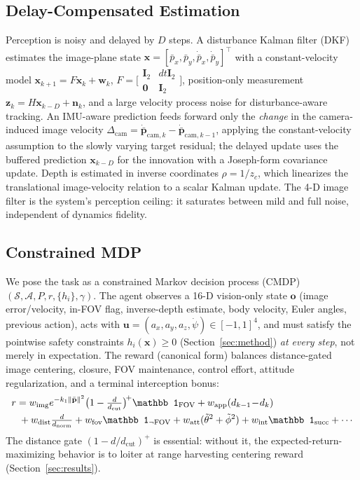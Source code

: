 \documentclass[journal]{IEEEtran}
\begin{document}
\subsection{Delay-Compensated Estimation}
Perception is noisy and delayed by $D$ steps. A disturbance Kalman filter
(DKF) estimates the image-plane state
$\mathbf x=[\bar p_x,\bar p_y,\dot{\bar p}_x,\dot{\bar p}_y]^\top$ with a
constant-velocity model $\mathbf x_{k+1}=F\mathbf x_k+\mathbf w_k$,
$F=\big[\begin{smallmatrix}\mathbf I_2&dt\mathbf I_2\\\mathbf 0&\mathbf I_2\end{smallmatrix}\big]$,
position-only measurement $\mathbf z_k=H\mathbf x_{k-D}+\mathbf n_k$, and a
large velocity process noise for disturbance-aware tracking. An IMU-aware
prediction feeds forward only the \emph{change} in the camera-induced image
velocity $\Delta_{\mathrm{cam}}=\dot{\bar{\mathbf p}}_{\mathrm{cam},k}-
\dot{\bar{\mathbf p}}_{\mathrm{cam},k-1}$, applying the constant-velocity
assumption to the slowly varying target residual; the delayed update uses the
buffered prediction $\mathbf x_{k-D}$ for the innovation with a Joseph-form
covariance update. Depth is estimated in inverse coordinates $\rho=1/z_c$,
which linearizes the translational image-velocity relation to a scalar Kalman
update. The 4-D image filter is the system's perception ceiling: it saturates
between mild and full noise, independent of dynamics fidelity.

\subsection{Constrained MDP}
We pose the task as a constrained Markov decision process (CMDP)
\cite{altman1999cmdp} $(\mathcal S,\mathcal A,P,r,\{h_i\},\gamma)$. The agent
observes a 16-D vision-only state $\mathbf o$ (image error/velocity, in-FOV
flag, inverse-depth estimate, body velocity, Euler angles, previous action),
acts with $\mathbf u=(a_x,a_y,a_z,\dot\psi)\in[-1,1]^4$, and must satisfy the
pointwise safety constraints $h_i(\mathbf x)\ge0$ (Section~\ref{sec:method})
\emph{at every step}, not merely in expectation. The reward (canonical form)
balances distance-gated image centering, closure, FOV maintenance, control
effort, attitude regularization, and a terminal interception bonus:
\begin{align}
r &= w_{\mathrm{img}}e^{-k_1\lVert\bar{\mathbf p}\rVert^2}
      \big(1-\tfrac{d}{d_{\mathrm{cut}}}\big)^{\!+}\mathbb 1_{\mathrm{FOV}}
   + w_{\mathrm{app}}(d_{k-1}\!-\!d_k) \notag\\
  &\;+ w_{\mathrm{dist}}\tfrac{d}{d_{\mathrm{norm}}}
   + w_{\mathrm{fov}}\mathbb 1_{\neg\mathrm{FOV}}
   + w_{\mathrm{att}}(\tilde\theta^2+\tilde\phi^2)
   + w_{\mathrm{int}}\mathbb 1_{\mathrm{succ}} + \cdots
\label{eq:reward}
\end{align}
The distance gate $(1-d/d_{\mathrm{cut}})^+$ is essential: without it, the
expected-return-maximizing behavior is to loiter at range harvesting centering
reward (Section~\ref{sec:results}).
\end{document}

